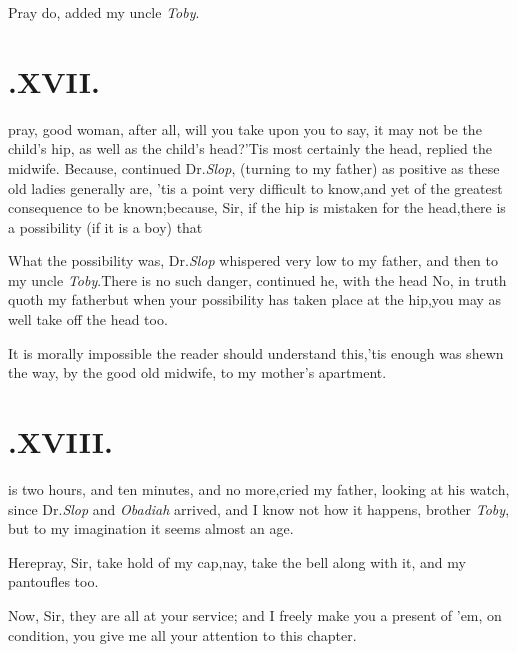 \documentclass{article}
\begin{document}
Pray do, added my uncle \textit{Toby}.

\section{.\quad  XVII.}

 pray, good woman, after all, will
you take upon you to say, it may not be the child’s hip, as well
as the child’s head?\tsh ’Tis most certainly the head, replied
the midwife. Because, continued Dr.\@ \textit{Slop}, (turning to
my father) as positive as these old ladies generally are,\tsh
’tis a point very difficult to know,\tsk and yet of the greatest
consequence to be known;\tsh because, Sir, if the hip is
mistaken for the head,\tsk there is a possibility (if it is a
boy) that\break 
{}

\tsh What the possibility was, Dr.\@ \textit{Slop}
whispered very low to my father, and then to my uncle
\textit{Toby}.\tsh There is no
such danger, continued he, with the head\break
\tsk No, in truth quoth my father\tsk but when
your possibility has taken place at the hip,\tsk you may as well
take off the head too.

\tsh It is morally impossible the reader should understand this,\tsh ’tis
enough\break 
{}
was shewn the way, by the good old mid\-wife, to my
mother’s apartment.

\section{.\quad  XVIII.}

 is two hours, and ten minutes,\tsk\break
and no more,\tsh cried my father, looking at his
watch, since Dr.\@ \textit{Slop} and
\textit{Obadiah} arrived, \tsh and I know not how it happens,
brother \textit{Toby}, \tsh\break but to my imagination it seems
almost an age.

\tsh Here\tsh pray, Sir, take hold of my cap,\tsk nay, take the bell along with it, and my
pantoufles too.\tsh

Now, Sir, they are all at your service; and I freely make you a
present of ’em, on condition, you give me all your attention
to this chapter.
\end{document}
